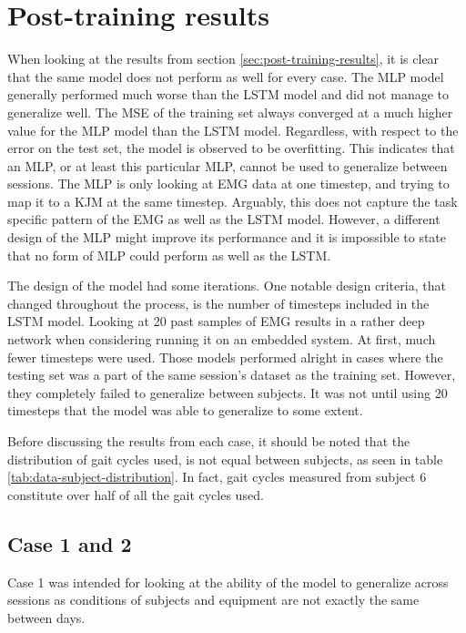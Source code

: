 \documentclass[../main.tex]{subfiles}
\begin{document}
\section{Post-training results}
\label{sec:discussion_post-training-results}
When looking at the results from section \ref{sec:post-training-results}, it is clear that the same model does not perform as well for every case.
The \ac{MLP} model generally performed much worse than the \ac{LSTM} model and did not manage to generalize well.
The \ac{MSE} of the training set always converged at a much higher value for the \ac{MLP} model than the \ac{LSTM} model.
Regardless, with respect to the error on the test set, the model is observed to be overfitting.
This indicates that an \ac{MLP}, or at least this particular \ac{MLP}, cannot be used to generalize between sessions.
The \ac{MLP} is only looking at \ac{EMG} data at one timestep, and trying to map it to a \ac{KJM} at the same timestep.
Arguably, this does not capture the task specific pattern of the \ac{EMG} as well as the \ac{LSTM} model.
However, a different design of the \ac{MLP} might improve its performance and it is impossible to state that no form of \ac{MLP} could perform as well as the \ac{LSTM}.

The design of the model had some iterations. 
One notable design criteria, that changed throughout the process, is the number of timesteps included in the \ac{LSTM} model.
Looking at 20 past samples of \ac{EMG} results in a rather deep network when considering running it on an embedded system.
At first, much fewer timesteps were used.
Those models performed alright in cases where the testing set was a part of the same session's dataset as the training set.
However, they completely failed to generalize between subjects.
It was not until using 20 timesteps that the model was able to generalize to some extent.

Before discussing the results from each case, it should be noted that the distribution of gait cycles used, is not equal between subjects, as seen in table \ref{tab:data-subject-distribution}. 
In fact, gait cycles measured from subject 6 constitute over half of all the gait cycles used.


\subsection{Case 1 and 2}
\label{sec:discussion-case1and2}
Case 1 was intended for looking at the ability of the model to generalize across sessions as conditions of subjects and equipment are not exactly the same between days.
\end{document}

